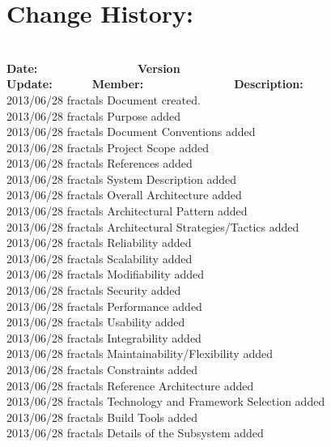 \documentclass[29pt,a4paper]{moderncv}
\begin{document}
\section{\textbf{Change History:}}
\begin{tabbing}
\\\textbf{Date:} ~~~~~~~~~~~~~~~~~\= \textbf{Version Update:}~~~~~~~\= \textbf{Member:}~~~~~~~~~~~~~~~~\= \textbf{Description:}\\
2013/06/28 \>fractals \> Document created.\\
2013/06/28  \> fractals \>Purpose added\\
2013/06/28  \> fractals \>Document Conventions added\\
2013/06/28  \> fractals \>Project Scope added\\
2013/06/28  \> fractals \>References added\\
2013/06/28  \> fractals \>System Description added \\
2013/06/28  \> fractals \>Overall Architecture added\\
2013/06/28  \> fractals \>Architectural Pattern added\\	
2013/06/28  \> fractals \>Architectural Strategies/Tactics added\\
2013/06/28  \>fractals \> Reliability added\\
2013/06/28  \>fractals \> Scalability added\\
2013/06/28  \>fractals \> Modifiability added\\
2013/06/28  \>fractals \> Security added\\
2013/06/28  \> fractals \>Performance added\\
2013/06/28  \> fractals \>Usability added\\
2013/06/28  \> fractals \>Integrability added\\
2013/06/28  \> fractals \>Maintainability/Flexibility added\\
2013/06/28  \> fractals \>Constraints added\\
2013/06/28  \> fractals \>Reference Architecture added\\
2013/06/28  \> fractals \>Technology and Framework Selection added\\
2013/06/28  \> fractals \>Build Tools added\\
2013/06/28  \> fractals \>Details of the Subsystem added\\

\end{tabbing}
\end{document}
